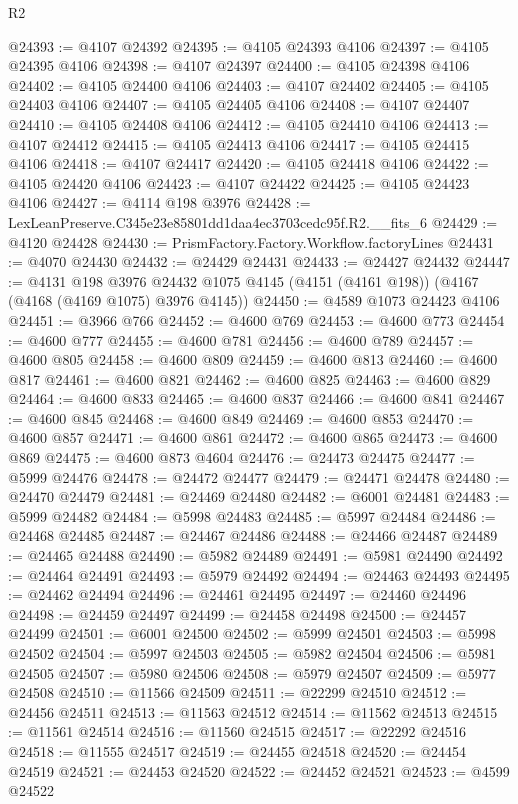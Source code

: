 \begin{lexlean}{R2}
\begin{coremodule}
@24393 := @4107 @24392
@24395 := @4105 @24393 @4106
@24397 := @4105 @24395 @4106
@24398 := @4107 @24397
@24400 := @4105 @24398 @4106
@24402 := @4105 @24400 @4106
@24403 := @4107 @24402
@24405 := @4105 @24403 @4106
@24407 := @4105 @24405 @4106
@24408 := @4107 @24407
@24410 := @4105 @24408 @4106
@24412 := @4105 @24410 @4106
@24413 := @4107 @24412
@24415 := @4105 @24413 @4106
@24417 := @4105 @24415 @4106
@24418 := @4107 @24417
@24420 := @4105 @24418 @4106
@24422 := @4105 @24420 @4106
@24423 := @4107 @24422
@24425 := @4105 @24423 @4106
@24427 := @4114 @198 @3976
@24428 := LexLeanPreserve.C345e23e85801dd1daa4ec3703cedc95f.R2.__fits_6
@24429 := @4120 @24428
@24430 := PrismFactory.Factory.Workflow.factoryLines
@24431 := @4070 @24430
@24432 := @24429 @24431
@24433 := @24427 @24432
@24447 := @4131
    @198
    @3976
    @24432
    @1075
    @4145
    (@4151 (@4161 @198))
    (@4167 (@4168 (@4169 @1075) @3976 @4145))
@24450 := @4589 @1073 @24423 @4106
@24451 := @3966 @766
@24452 := @4600 @769
@24453 := @4600 @773
@24454 := @4600 @777
@24455 := @4600 @781
@24456 := @4600 @789
@24457 := @4600 @805
@24458 := @4600 @809
@24459 := @4600 @813
@24460 := @4600 @817
@24461 := @4600 @821
@24462 := @4600 @825
@24463 := @4600 @829
@24464 := @4600 @833
@24465 := @4600 @837
@24466 := @4600 @841
@24467 := @4600 @845
@24468 := @4600 @849
@24469 := @4600 @853
@24470 := @4600 @857
@24471 := @4600 @861
@24472 := @4600 @865
@24473 := @4600 @869
@24475 := @4600 @873 @4604
@24476 := @24473 @24475
@24477 := @5999 @24476
@24478 := @24472 @24477
@24479 := @24471 @24478
@24480 := @24470 @24479
@24481 := @24469 @24480
@24482 := @6001 @24481
@24483 := @5999 @24482
@24484 := @5998 @24483
@24485 := @5997 @24484
@24486 := @24468 @24485
@24487 := @24467 @24486
@24488 := @24466 @24487
@24489 := @24465 @24488
@24490 := @5982 @24489
@24491 := @5981 @24490
@24492 := @24464 @24491
@24493 := @5979 @24492
@24494 := @24463 @24493
@24495 := @24462 @24494
@24496 := @24461 @24495
@24497 := @24460 @24496
@24498 := @24459 @24497
@24499 := @24458 @24498
@24500 := @24457 @24499
@24501 := @6001 @24500
@24502 := @5999 @24501
@24503 := @5998 @24502
@24504 := @5997 @24503
@24505 := @5982 @24504
@24506 := @5981 @24505
@24507 := @5980 @24506
@24508 := @5979 @24507
@24509 := @5977 @24508
@24510 := @11566 @24509
@24511 := @22299 @24510
@24512 := @24456 @24511
@24513 := @11563 @24512
@24514 := @11562 @24513
@24515 := @11561 @24514
@24516 := @11560 @24515
@24517 := @22292 @24516
@24518 := @11555 @24517
@24519 := @24455 @24518
@24520 := @24454 @24519
@24521 := @24453 @24520
@24522 := @24452 @24521
@24523 := @4599 @24522

\end{coremodule}
\end{lexlean}
